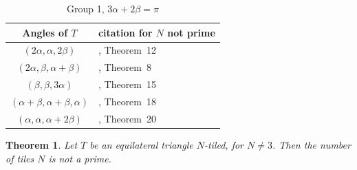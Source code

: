 \documentclass{amsart}
\theoremstyle{plain}
\newtheorem{theorem}{Theorem}
\theoremstyle{definition}
\theoremstyle{remark}
\begin{document}
\begin{table}[ht]
\caption{Group 1, $3\alpha + 2 \beta = \pi$}
\begin{center}
\begin{tabular}{c l}
Angles of $T$ &  citation for $N$ not prime\\
\hline
$(2\alpha,\alpha,2\beta)$  & \cite{beeson-triangletiling3}, Theorem~12 \\
$(2\alpha, \beta, \alpha + \beta)$ &  \cite{beeson-triangletiling3}, Theorem~8\\
$(\beta,\beta,3\alpha)$  & \cite{beeson-triangletiling3}, Theorem~15\\
$(\alpha+\beta,\alpha+\beta,\alpha)$  & \cite{beeson-triangletiling3}, Theorem~18\\
$(\alpha,\alpha,\alpha+2\beta)$  & \cite{beeson-triangletiling3}, Theorem~20
\end{tabular}
\end{center}
\label{table:Group1}
\end{table}%




\begin{theorem} \label{theorem:equilateral}  Let $T$ be an equilateral triangle $N$-tiled, for $N \neq 3$.
Then the number of tiles $N$ is not a prime.
\end{theorem}
\end{document}
